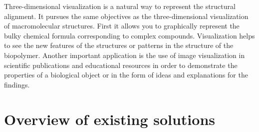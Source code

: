 \documentclass[a4paper, 12pt, titlepage, utf8]{extarticle}
\let\oldsection\section         %
\renewcommand{\section}{\newpage\oldsection}
\begin{document}
Three-dimensional visualization is a natural way to represent the structural
alignment. It pursues the same objectives as the three-dimensional visualization
of macromolecular structures. First it allows you to graphically represent the
bulky chemical formula corresponding to complex compounds. Visualization helps
to see the new features of the structures or patterns in the structure of the
biopolymer. Another important application is the use of image visualization in
scientific publications and educational resources in order to demonstrate the
properties of a biological object or in the form of ideas and explanations for
the findings.


\section{Overview of existing solutions}
\end{document}
